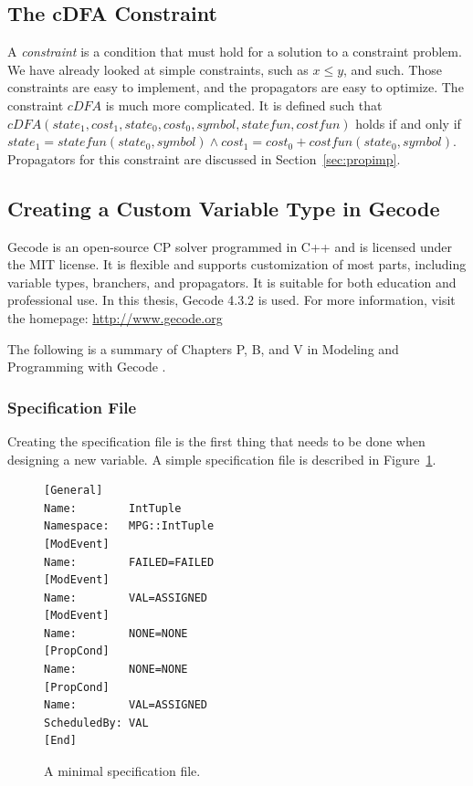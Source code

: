 \documentclass[a4paper,11pt]{article}
\begin{document}
\subsection{The cDFA Constraint}
\label{sec:cdfaconstraint}
A \textit{constraint} is a condition that must hold for a solution to a constraint problem. We have already looked at simple constraints, such as $x\le y$, and such. Those constraints are easy to implement, and the propagators are easy to optimize. The constraint $cDFA$ is much more complicated. It is defined such that $\mathit{cDFA}(\mathit{state_1}, \mathit{cost_1}, \mathit{state_0}, \mathit{cost_0}, \mathit{symbol}, \mathit{statefun}, \mathit{costfun})$ holds if and only if $\mathit{state_1}= \mathit{statefun}(\mathit{state_0}, \mathit{symbol}) \land \mathit{cost_1}=\mathit{cost_0}+\mathit{costfun}(\mathit{state_0}, \mathit{symbol})$. Propagators for this constraint are discussed in Section~\ref{sec:propimp}.

\subsection{Creating a Custom Variable Type in Gecode}
Gecode is an open-source CP solver programmed in C++ and is licensed under the MIT license. It is flexible and supports customization of most parts, including variable types, branchers, and propagators. It is suitable for both education and professional use. In this thesis, Gecode 4.3.2 is used.  For more information, visit the homepage: \url{http://www.gecode.org}

The following is a summary of Chapters P, B, and V in Modeling and Programming with Gecode \cite{mpg}. 

\subsubsection{Specification File}\label{sec:specfile}
Creating the specification file is the first thing that needs to be done when designing a new variable.  A simple specification file is described in Figure~\ref{fig:minimumspecfile}.

\begin{figure}[h]
\begin{minipage}{\linewidth}
\begin{lstlisting}[frame=single]
[General]
Name:        IntTuple
Namespace:   MPG::IntTuple
[ModEvent]
Name:        FAILED=FAILED
[ModEvent]
Name:        VAL=ASSIGNED
[ModEvent]
Name:        NONE=NONE
[PropCond]
Name:        NONE=NONE
[PropCond]
Name:        VAL=ASSIGNED
ScheduledBy: VAL
[End]
\end{lstlisting}
\end{minipage}
\caption{A minimal specification file.}
\label{fig:minimumspecfile}
\end{figure}
\end{document}
